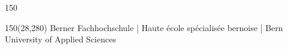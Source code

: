 \begin{titlepage}
\begin{flushleft}
\begin{textblock}{150}
\end{textblock}
\end{flushleft}

\begin{textblock}{150}(28,280)
\noindent 
\fontsize{9pt}{10pt}\selectfont
\textcolor{bfhgrey}{Berner Fachhochschule | Haute \'ecole sp\'ecialis\'ee bernoise | Bern University of Applied Sciences}
\color{black}\selectfont
\end{textblock}


\end{titlepage}

%
%
